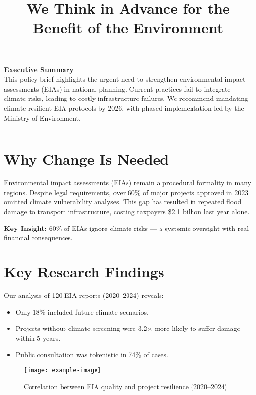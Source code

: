 \documentclass[a4paper,11pt]{article}
\title{\color{highlight}\textbf{We Think in Advance for the Benefit of the Environment}}
\author{}
\date{}
\newcommand{\keypoint}[1]{%
  \noindent\colorbox{highlight!10}{\parbox{\dimexpr\linewidth-2\fboxsep}{\textbf{Key Insight:} #1}}\vspace{0.5em}
}
\begin{document}
\maketitle

\noindent\textbf{\large Executive Summary}\\[0.5em]
This policy brief highlights the urgent need to strengthen environmental impact assessments (EIAs) in national planning. Current practices fail to integrate climate risks, leading to costly infrastructure failures. We recommend mandating climate-resilient EIA protocols by 2026, with phased implementation led by the Ministry of Environment.

\vspace{1em}
\hrule
\vspace{1.5em}

\section*{Why Change Is Needed}
Environmental impact assessments (EIAs) remain a procedural formality in many regions. Despite legal requirements, over 60\% of major projects approved in 2023 omitted climate vulnerability analyses. This gap has resulted in repeated flood damage to transport infrastructure, costing taxpayers \$2.1 billion last year alone.

\keypoint{60\% of EIAs ignore climate risks — a systemic oversight with real financial consequences.}

\section*{Key Research Findings}
Our analysis of 120 EIA reports (2020–2024) reveals:
\begin{itemize}[left=0pt]
    \item Only 18\% included future climate scenarios.
    \item Projects without climate screening were 3.2× more likely to suffer damage within 5 years.
    \item Public consultation was tokenistic in 74\% of cases.
\end{itemize}

\begin{figure}[h]
\centering
\texttt{[image: example-image]} %
\caption{Correlation between EIA quality and project resilience (2020–2024)}
\end{figure}
\end{document}
